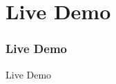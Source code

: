 \documentclass[usenames,dvipsnames]{beamer}
\begin{document}
\section{Live Demo}
\begin{frame}
\frametitle{Live Demo}
\begin{Huge}\begin{center}
Live Demo
\end{center}\end{Huge}
\end{frame}


%
%
%
%
%
%
%
%
%
%
\end{document}
